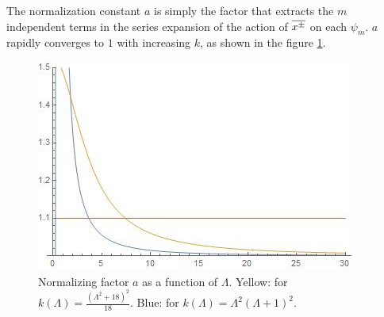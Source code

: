 The normalization constant $a$ is simply the factor that extracts the $m$ independent terms in the series expansion of the action of $\overline{x^\pm}$ on each $\psi_m$. $a$ rapidly converges to $1$ with increasing $k$, as shown in the figure \ref{fig:asolo}.%
\begin{figure}[h]
    \centering
    \includegraphics[width = 2\textwidth/3]{images/asolo.jpg}
    \caption{Normalizing factor $a$ as a function of $\Lambda$. Yellow: for $k(\Lambda) = \frac{(\Lambda^2 + 18)^2}{18}$. Blue: for $k(\Lambda) = \Lambda^2(\Lambda+1)^2$.}
    \label{fig:asolo}
\end{figure}


